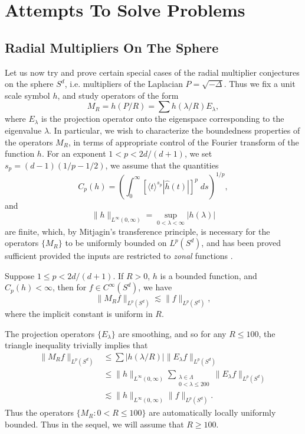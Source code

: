\part{Attempts To Solve Problems}

\chapter{Radial Multipliers On The Sphere}

Let us now try and prove certain special cases of the radial multiplier conjectures on the sphere $S^d$, i.e. multipliers of the Laplacian $P = \sqrt{-\Delta}$. Thus we fix a unit scale symbol $h$, and study operators of the form
%
\[ M_R = h \left( P / R \right) = \sum h(\lambda / R) E_\lambda, \]
%
where $E_\lambda$ is the projection operator onto the eigenspace corresponding to the eigenvalue $\lambda$. In particular, we wish to characterize the boundedness properties of the operators $M_R$, in terms of appropriate control of the Fourier transform of the function $h$. For an exponent $1 < p < 2d/(d+1)$, we set $s_p = (d-1)(1/p - 1/2)$, we assume that the quantities
%
\[ C_p(h) = \left( \int_0^\infty \left[ \langle t \rangle^{s_p} |\widehat{h}(t)| \right]^p\; ds \right)^{1/p}, \]
%
and
%
\[ \| h \|_{L^\infty(0,\infty)} = \sup_{0 < \lambda < \infty} |h(\lambda)| \]
%
are finite, which, by Mitjagin's transference principle, is necessary for the operators $\{ M_R \}$ to be uniformly bounded on $L^p(S^d)$, and has been proved sufficient provided the inputs are restricted to \emph{zonal} functions \cite{Alladi}.

\begin{theorem} \label{MainSphereTheorem}
    Suppose $1 \leq p < 2d/(d+1)$. If $R > 0$, $h$ is a bounded function, and $C_p(h) < \infty$, then for $f \in C^\infty(S^d)$, we have
    \[ \| M_R f \|_{L^p(S^d)} \lesssim \| f \|_{L^p(S^d)}, \]
    where the implicit constant is uniform in $R$.
\end{theorem}

The projection operators $\{ E_\lambda \}$ are smoothing, and so for any $R \leq 100$, the triangle inequality trivially implies that
%
\begin{align*}
    \| M_R f \|_{L^p(S^d)} &\leq \sum |h(\lambda/R)| \| E_\lambda f \|_{L^p(S^d)}\\
    &\leq \| h \|_{L^\infty(0,\infty)} \sum_{\substack{\lambda \in \Lambda \\ 0 < \lambda \leq 200}} \| E_\lambda f \|_{L^p(S^d)}\\
    &\lesssim \| h \|_{L^\infty(0,\infty)} \| f \|_{L^p(S^d)}.
\end{align*}
%
Thus the operators $\{ M_R : 0 < R \leq 100 \}$ are automatically locally uniformly bounded. Thus in the sequel, we will assume that $R \geq 100$.

